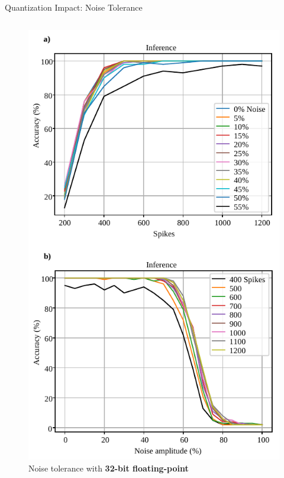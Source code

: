 \begin{frame}{Quantization Impact: Noise Tolerance}
	\begin{columns}
		\begin{column}{0.33\textwidth}
			\centering
			\begin{figure}
			\includegraphics[width=0.75\linewidth]{../chapters/sbs_accelerator/figures/accuracy_vs_noise_pu_fp.pdf} %
			\caption{ Noise tolerance with \textbf{32-bit floating-point}}
			\end{figure}
			\pause
		\end{column}
		

\end{columns}
\end{frame}

